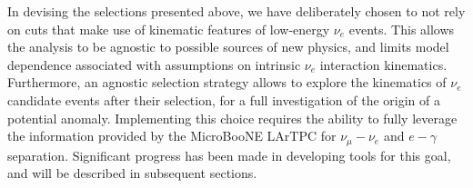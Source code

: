 \documentclass[a4paper]{article}
\begin{document}
\par %
In devising the selections presented above, we have deliberately chosen to not rely on cuts that make use of kinematic features of low-energy $\nu_e$ events. This allows the analysis to be agnostic to possible sources of new physics, and limits model dependence associated with assumptions on intrinsic $\nu_e$ interaction kinematics. Furthermore, an agnostic selection strategy allows to explore the kinematics of $\nu_e$ candidate events after their selection, for a full investigation of the origin of a potential anomaly. Implementing this choice requires the ability to fully leverage the information provided by the MicroBooNE LArTPC for $\nu_{\mu}-\nu_e$ and $e-\gamma$ separation. Significant progress has been made in developing tools for this goal, and will be described in subsequent sections. 
\end{document}
